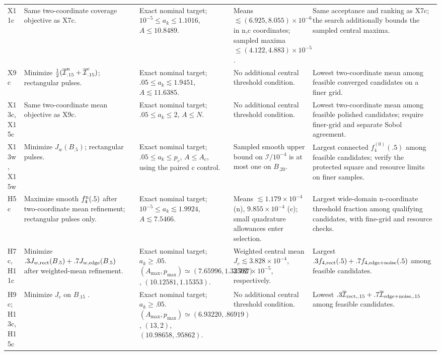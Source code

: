 {\begin{longtable}{>{\raggedright\arraybackslash}p{1.9cm}>{\raggedright\arraybackslash}p{5.6cm}>{\raggedright\arraybackslash}p{5.3cm}>{\raggedright\arraybackslash}p{4.7cm}>{\raggedright\arraybackslash}p{7.4cm}}
X11c & Same two-coordinate coverage objective as X7c. & Exact nominal target; $10^{-5}\leq a_k\leq1.1016$, $A\leq10.8489$. & Means $\lesssim(6.925,8.055)\times10^{-6}$ in n,c coordinates; sampled maxima $\leq(4.122,4.883)\times10^{-5}$. & Same acceptance and ranking as X7c; the search additionally bounds the sampled central maxima. \\[2pt]
X9c & Minimize $\tfrac12(\overline{\mathcal I}^{\rm n}_{.15}+\overline{\mathcal I}^{\rm c}_{.15})$; rectangular pulses. & Exact nominal target; $.05\leq a_k\lesssim1.9451$, $A\lesssim11.6385$. & No additional central threshold condition. & Lowest two-coordinate mean among feasible converged candidates on a finer grid. \\[2pt]
X13c, X15c & Same two-coordinate mean objective as X9c. & Exact nominal target; $.05\leq a_k\leq2$, $A\leq N$. & No additional central threshold condition. & Lowest two-coordinate mean among feasible polished candidates; require finer-grid and separate Sobol agreement. \\[2pt]
X13w, X15w & Minimize $J_w(B_{.5})$; rectangular pulses. & Exact nominal target; $.05\leq a_k\leq p_c$, $A\leq A_c$, using the paired c control. & Sampled smooth upper bound on $\mathcal I/10^{-4}$ is at most one on $B_{.20}$. & Largest connected $f_4^{(0)}(.5)$ among feasible candidates; verify the protected square and resource limits on finer samples. \\[2pt]
H5c & Maximize smooth $f_4^{\rm n}(.5)$ after two-coordinate mean refinement; rectangular pulses only. & Exact nominal target; $10^{-5}\leq a_k\lesssim1.9924$, $A\lesssim7.5466$. & Means $\lesssim1.179\times10^{-4}$ (n), $9.855\times10^{-4}$ (c); small quadrature allowances enter selection. & Largest wide-domain n-coordinate threshold fraction among qualifying candidates, with fine-grid and resource checks. \\[2pt]
H7c, H11c & Minimize $.3J_{w,\rm rect}(B_{.5})+.7J_{w,\rm edge}(B_{.5})$ after weighted-mean refinement. & Exact nominal target; $a_k\geq.05$. $(A_{\max},p_{\max})\simeq(7.65996,1.32562)$, $(10.12581,1.15353)$. & Weighted central mean $J_c\lesssim3.828\times10^{-4}$, $3.787\times10^{-5}$, respectively. & Largest $.3f_{4,\rm rect}(.5)+.7f_{4,\rm edge+noise}(.5)$ among feasible candidates. \\[2pt]
H9c; H13c, H15c & Minimize $J_c$ on $B_{.15}$ . & Exact nominal target; $a_k\geq.05$. $(A_{\max},p_{\max})\simeq(6.93220,.86919)$, $(13,2)$, $(10.98658,.95862)$. & No additional central threshold condition. & Lowest $.3\overline{\mathcal I}_{\rm rect,.15}+.7\overline{\mathcal I}_{\rm edge+noise,.15}$ among feasible candidates. \\[2pt]

\end{longtable}}
